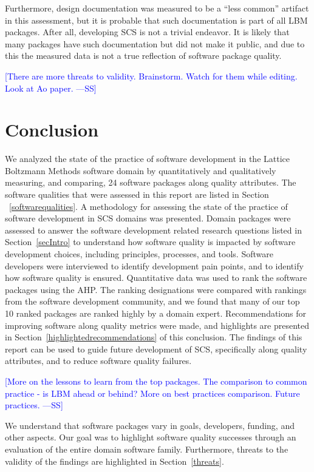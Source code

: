 \documentclass[final, 3p, times, authoryear]{elsarticle}
\newcommand{\authornote}[3]{\textcolor{#1}{[#3 ---#2]}}
\newcommand{\authornote}[3]{}
\newcommand{\wss}[1]{\authornote{blue}{SS}{#1}} %
\begin{document}
Furthermore, design documentation was measured to be a ``less common'' artifact
in this assessment, but it is probable that such documentation is part of all
LBM packages. After all, developing SCS is not a trivial endeavor. It is likely
that many packages have such documentation but did not make it public, and due
to this the measured data is not a true reflection of software package quality.

\wss{There are more threats to validity.  Brainstorm.  Watch for them while 
editing.  Look at Ao paper.}

\section{Conclusion} \label{conclusion}

We analyzed the state of the practice of software development in the Lattice
Boltzmann Methods software domain by quantitatively and qualitatively measuring,
and comparing, 24 software packages along quality attributes. The software
qualities that were assessed in this report are listed in Section
~\ref{softwarequalities}. A methodology for assessing the state of the practice
of software development in SCS domains was presented. Domain packages were
assessed to answer the software development related research questions listed in
Section~\ref{secIntro} to understand how software quality is impacted by software
development choices, including principles, processes, and tools. Software
developers were interviewed to identify development pain points, and to identify
how software quality is ensured. Quantitative data was used to rank the software
packages using the AHP. The ranking designations were compared with rankings
from the software development community, and we found that many of our top 10
ranked packages are ranked highly by a domain expert. Recommendations for
improving software along quality metrics were made, and highlights are presented
in Section~\ref{highlightedrecommendations} of this conclusion. The findings of
this report can be used to guide future development of SCS, specifically along
quality attributes, and to reduce software quality failures.

\wss{More on the lessons to learn from the top packages.  The comparison to
common practice - is LBM ahead or behind?  More on best practices comparison.
Future practices.}

We understand that software packages vary in goals, developers, funding, and
other aspects. Our goal was to highlight software quality successes through an
evaluation of the entire domain software family. Furthermore, threats to the
validity of the findings are highlighted in Section~\ref{threats}. 
\end{document}
